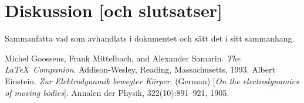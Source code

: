 \documentclass[a4paper,12pt]{article}
\begin{document}
\section{Diskussion [och slutsatser]}
\label{sec:disk}


Sammanfatta vad som avhandlats i dokumentet och sätt det i
sitt sammanhang.
%
\begin{thebibliography}{99}
%
Michel Goossens, Frank Mittelbach, and Alexander Samarin. 
\textit{The \LaTeX\ Companion}. 
Addison-Wesley, Reading, Massachusetts, 1993.
%
Albert Einstein. 
\textit{Zur Elektrodynamik bewegter K{\"o}rper}. (German) 
[\textit{On the electrodynamics of moving bodies}]. 
Annalen der Physik, 322(10):891–921, 1905.
%
\end{thebibliography}
%
\end{document}
